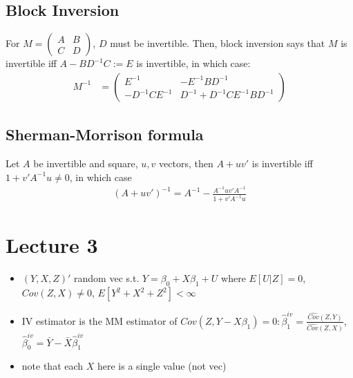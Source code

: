 \documentclass[11pt]{article} %
\begin{document}
\subsection{Block Inversion}
For $M = \begin{pmatrix} A & B \\ C & D \end{pmatrix}$, $D$ must be invertible. Then, block inversion says that $M$ is invertible iff $A-BD^{-1}C:= E$ is invertible, in which case:
\begin{align*}
M^{-1} &= \begin{pmatrix} E^{-1} & -E^{-1}BD^{-1} \\ -D^{-1} C E^{-1} & D^{-1} + D^{-1}CE^{-1}BD^{-1} \end{pmatrix}
\end{align*}
\subsection{Sherman-Morrison formula}
Let $A$ be invertible and square, $u,v$ vectors, then $A+uv'$ is invertible iff $1+v'A^{-1}u\neq 0$, in which case
\begin{align*}
(A+uv')^{-1} = A^{-1} - \frac{A^{-1}uv'A^{-1}}{1+v'A^{-1}u}
\end{align*}
\section{Lecture 3}
\begin{itemize}
\item $(Y,X,Z)'$ random vec s.t. $Y=\beta_0 + X\beta_1 +U$ where $E[U|Z] = 0$,$Cov(Z,X) \neq 0$, $E[Y^2 + X^2 + Z^2] < \infty$
\item IV estimator is the MM estimator of $Cov(Z,Y-X\beta_1) = 0: \hat{\beta}^{iv}_1 = \frac{\hat{Cov}(Z,Y)}{\hat{Cov}(Z,X)}$, $\hat{\beta}_{0}^{iv} = \bar{Y} - \bar{X}\hat{\beta}^{iv}_1$
\item note that each $X$ here is a single value (not vec)
\end{itemize}
\end{document}
